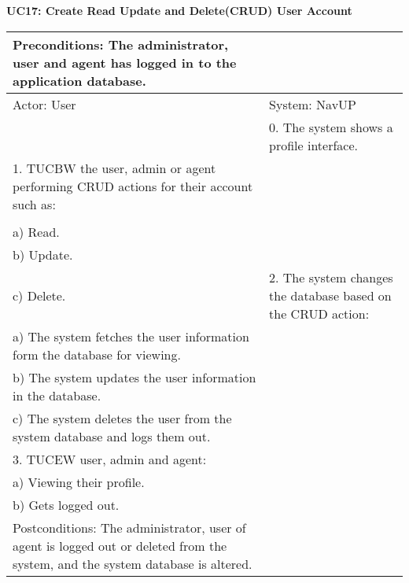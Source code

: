 \documentclass{article}
\begin{document}
	
        		\centering
					\textbf{UC17: Create Read Update and Delete(CRUD) User Account}\\
       		 \small
       		 \begin{tabular}{|p{8cm}|p{8cm}|}
       		 \hline
       		 Preconditions: The administrator, user and agent has logged in to the application database.& \\
       		 \hline
       		 Actor: User & System: NavUP \\
        		\hline
       		 &0.	The system shows a profile interface.\\
       		 \hline
       		1.	TUCBW the user, admin or agent performing CRUD actions for their account such as:\\

\\a)	Read.
\\b)	Update.
\\c)	Delete.
 & 2.	The system changes the database based on the CRUD action:

\\a)	The system fetches the user information form the database for viewing.
\\b)	The system updates the user information in the database.
\\c)	The system deletes the user from the system database and logs them out.

\\
        		\hline
       		3.	TUCEW user, admin and agent:

\\a)	Viewing their profile.
\\b)	Gets logged out.
&\\
       		 \hline
        		Postconditions: The administrator, user of agent is logged out or deleted from the system, and the system database is altered. & \\
        		\hline
        \end{tabular} 
        
\end{document}

